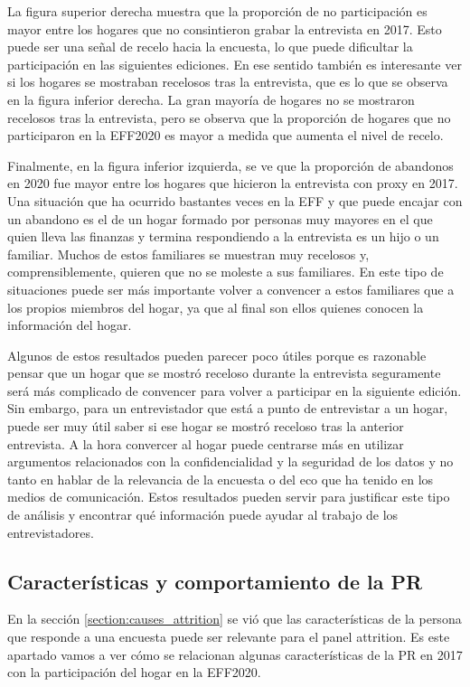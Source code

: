 La figura superior derecha muestra que la proporción de no participación es mayor entre los hogares que no consintieron grabar la entrevista en 2017. Esto puede ser una señal de recelo hacia la encuesta, lo que puede dificultar la participación en las siguientes ediciones. En ese sentido también es interesante ver si los hogares se mostraban recelosos tras la entrevista, que es lo que se observa en la figura inferior derecha. La gran mayoría de hogares no se mostraron recelosos tras la entrevista, pero se observa que la proporción de hogares que no participaron en la EFF2020 es mayor a medida que aumenta el nivel de recelo.

Finalmente, en la figura inferior izquierda, se ve que la proporción de abandonos en 2020 fue mayor entre los hogares que hicieron la entrevista con proxy en 2017. Una situación que ha ocurrido bastantes veces en la EFF y que puede encajar con un abandono es el de un hogar formado por personas muy mayores en el que quien lleva las finanzas y termina respondiendo a la entrevista es un hijo o un familiar. Muchos de estos familiares se muestran muy recelosos y, comprensiblemente, quieren que no se moleste a sus familiares. En este tipo de situaciones puede ser más importante volver a convencer a estos familiares que a los propios miembros del hogar, ya que al final son ellos quienes conocen la información del hogar.

Algunos de estos resultados pueden parecer poco útiles porque es razonable pensar que un hogar que se mostró receloso durante la entrevista seguramente será más complicado de convencer para volver a participar en la siguiente edición. Sin embargo, para un entrevistador que está a punto de entrevistar a un hogar, puede ser muy útil saber si ese hogar se mostró receloso tras la anterior entrevista. A la hora convercer al hogar puede centrarse más en utilizar argumentos relacionados con la confidencialidad y la seguridad de los datos y no tanto en hablar de la relevancia de la encuesta o del eco que ha tenido en los medios de comunicación. Estos resultados pueden servir para justificar este tipo de análisis y encontrar qué información puede ayudar al trabajo de los entrevistadores.

\subsection*{Características y comportamiento de la PR}

En la sección \ref{section:causes_attrition} se vió que las características de la persona que responde a una encuesta puede ser relevante para el panel attrition. Es este apartado vamos a ver cómo se relacionan algunas características de la PR en 2017 con la participación del hogar en la EFF2020.

